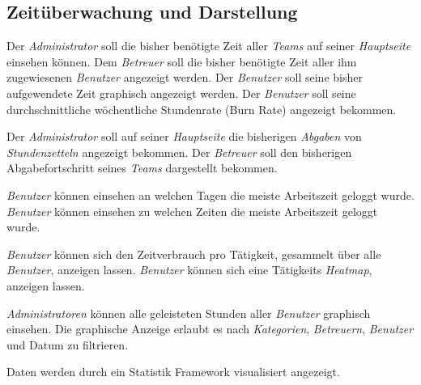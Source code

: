 \subsection{Zeitüberwachung und Darstellung}
    \begin{requirements}
        \begin{requirements}
             Der \emph{Administrator} soll die bisher benötigte Zeit aller \emph{Teams} auf seiner \emph{Hauptseite} einsehen können.
             Dem \emph{Betreuer} soll die bisher benötigte Zeit aller ihm zugewiesenen \emph{Benutzer} angezeigt werden.
             Der \emph{Benutzer} soll seine bisher aufgewendete Zeit graphisch angezeigt werden.
             Der \emph{Benutzer} soll seine durchschnittliche wöchentliche Stundenrate (Burn Rate) angezeigt bekommen.
        \end{requirements}

        \begin{requirements}
             Der \emph{Administrator} soll auf seiner \emph{Hauptseite} die bisherigen \emph{Abgaben} von \emph{Stundenzetteln} angezeigt bekommen.
             Der \emph{Betreuer} soll den bisherigen Abgabefortschritt seines \emph{Teams} dargestellt bekommen.
        \end{requirements}

        \begin{requirements}
             \emph{Benutzer} können einsehen an welchen Tagen die meiste Arbeitszeit geloggt wurde.
             \emph{Benutzer} können einsehen zu welchen Zeiten die meiste Arbeitszeit geloggt wurde.
        \end{requirements}

        \begin{requirements}
             \emph{Benutzer} können sich den Zeitverbrauch pro Tätigkeit, gesammelt über alle \emph{Benutzer}, anzeigen lassen.
             \emph{Benutzer} können sich eine Tätigkeits \emph{Heatmap}, anzeigen lassen.
        \end{requirements}
        
        \begin{requirements}
              \emph{Administratoren} können alle geleisteten Stunden aller \emph{Benutzer} graphisch einsehen.
              Die graphische Anzeige erlaubt es nach \emph{Kategorien}, \emph{Betreuern}, \emph{Benutzer} und Datum zu filtrieren.
        \end{requirements}

        Daten werden durch ein Statistik Framework visualisiert angezeigt.
    \end{requirements}

